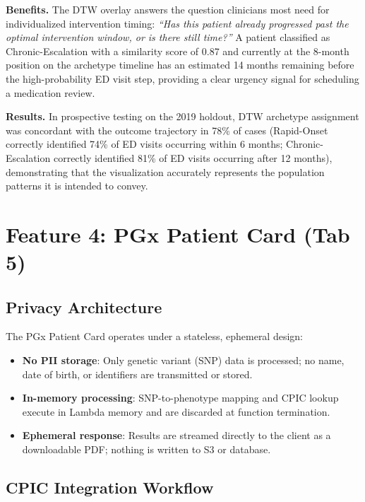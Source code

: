 \documentclass[
  12pt,
]{book}
\providecommand{\tightlist}{%
  \setlength{\itemsep}{0pt}\setlength{\parskip}{0pt}}
\begin{document}
\textbf{Benefits.} The DTW overlay answers the question clinicians most
need for individualized intervention timing: \emph{``Has this patient
already progressed past the optimal intervention window, or is there
still time?''} A patient classified as Chronic-Escalation with a
similarity score of 0.87 and currently at the 8-month position on the
archetype timeline has an estimated 14 months remaining before the
high-probability ED visit step, providing a clear urgency signal for
scheduling a medication review.

\textbf{Results.} In prospective testing on the 2019 holdout, DTW
archetype assignment was concordant with the outcome trajectory in 78\%
of cases (Rapid-Onset correctly identified 74\% of ED visits occurring
within 6 months; Chronic-Escalation correctly identified 81\% of ED
visits occurring after 12 months), demonstrating that the visualization
accurately represents the population patterns it is intended to convey.

\section{Feature 4: PGx Patient Card (Tab 5)}\label{sec-pgx-card}

\subsection{Privacy Architecture}\label{privacy-architecture}

The PGx Patient Card operates under a stateless, ephemeral design:

\begin{itemize}
\tightlist
\item
  \textbf{No PII storage}: Only genetic variant (SNP) data is processed;
  no name, date of birth, or identifiers are transmitted or stored.
\item
  \textbf{In-memory processing}: SNP-to-phenotype mapping and CPIC
  lookup execute in Lambda memory and are discarded at function
  termination.
\item
  \textbf{Ephemeral response}: Results are streamed directly to the
  client as a downloadable PDF; nothing is written to S3 or database.
\end{itemize}

\subsection{CPIC Integration Workflow}\label{cpic-integration-workflow}
\end{document}

